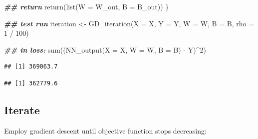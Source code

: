 \documentclass[
]{book}
\newenvironment{Shaded}{\begin{snugshade}}{\end{snugshade}}
\newcommand{\AttributeTok}[1]{\textcolor[rgb]{0.77,0.63,0.00}{#1}}
\newcommand{\DecValTok}[1]{\textcolor[rgb]{0.00,0.00,0.81}{#1}}
\newcommand{\DocumentationTok}[1]{\textcolor[rgb]{0.56,0.35,0.01}{\textbf{\textit{#1}}}}
\newcommand{\FunctionTok}[1]{\textcolor[rgb]{0.00,0.00,0.00}{#1}}
\newcommand{\NormalTok}[1]{#1}
\newcommand{\OtherTok}[1]{\textcolor[rgb]{0.56,0.35,0.01}{#1}}
\newcommand{\SpecialCharTok}[1]{\textcolor[rgb]{0.00,0.00,0.00}{#1}}
\begin{document}
\begin{Shaded}
\begin{Highlighting}[]
  \DocumentationTok{\#\# return}
  \FunctionTok{return}\NormalTok{(}\FunctionTok{list}\NormalTok{(}\AttributeTok{W =}\NormalTok{ W\_out,}
              \AttributeTok{B =}\NormalTok{ B\_out))}
\NormalTok{\}}

\DocumentationTok{\#\# test run}
\NormalTok{iteration }\OtherTok{\textless{}{-}} \FunctionTok{GD\_iteration}\NormalTok{(}\AttributeTok{X =}\NormalTok{ X,}
                          \AttributeTok{Y =}\NormalTok{ Y,}
                          \AttributeTok{W =}\NormalTok{ W,}
                          \AttributeTok{B =}\NormalTok{ B,}
                          \AttributeTok{rho =} \DecValTok{1} \SpecialCharTok{/} \DecValTok{100}\NormalTok{)}

\DocumentationTok{\#\# in loss:}
\FunctionTok{sum}\NormalTok{((}\FunctionTok{NN\_output}\NormalTok{(}\AttributeTok{X =}\NormalTok{ X, }\AttributeTok{W =}\NormalTok{ W, }\AttributeTok{B =}\NormalTok{ B) }\SpecialCharTok{{-}}\NormalTok{ Y)}\SpecialCharTok{\^{}}\DecValTok{2}\NormalTok{)}
\end{Highlighting}
\end{Shaded}

\begin{verbatim}
## [1] 369063.7
\end{verbatim}

\begin{Shaded}
\end{Shaded}

\begin{verbatim}
## [1] 362779.6
\end{verbatim}

\hypertarget{iterate}{%
\subsection{Iterate}\label{iterate}}

Employ gradient descent until objective function stops decreasing:
\end{document}
